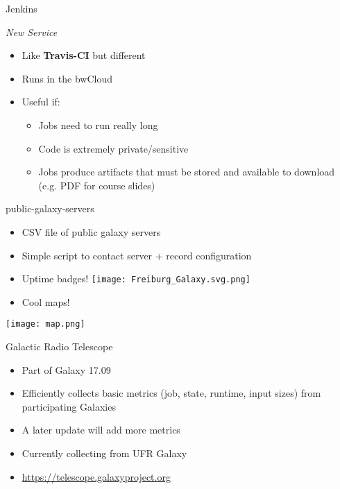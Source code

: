 \documentclass[12pt]{ufrslides}
\begin{document}
	\begin{frame}{Jenkins}
		\begin{center}
			\emph{New Service}
		\end{center}
		\begin{itemize}
			\item Like \textbf{Travis-CI} but different
			\item Runs in the bwCloud
			\item Useful if:
				\begin{itemize}
					\item Jobs need to run really long
					\item Code is extremely private/sensitive
					\item Jobs produce artifacts that must be stored and
						available to download (e.g. PDF for course slides)
				\end{itemize}
		\end{itemize}
	\end{frame}

	\begin{frame}{public-galaxy-servers}
		\begin{itemize}
			\item CSV file of public galaxy servers
			\item Simple script to contact server + record configuration
			\item Uptime badges! \texttt{[image: Freiburg\_Galaxy.svg.png]}
			\item Cool maps!
		\end{itemize}
		\texttt{[image: map.png]}
	\end{frame}

	\begin{frame}{Galactic Radio Telescope}
		\begin{itemize}
			\item Part of Galaxy 17.09
			\item Efficiently collects basic metrics (job, state, runtime, input sizes) from participating Galaxies
			\item A later update will add more metrics
			\item Currently collecting from UFR Galaxy
			\item \url{https://telescope.galaxyproject.org}
		\end{itemize}
	\end{frame}
\end{document}
